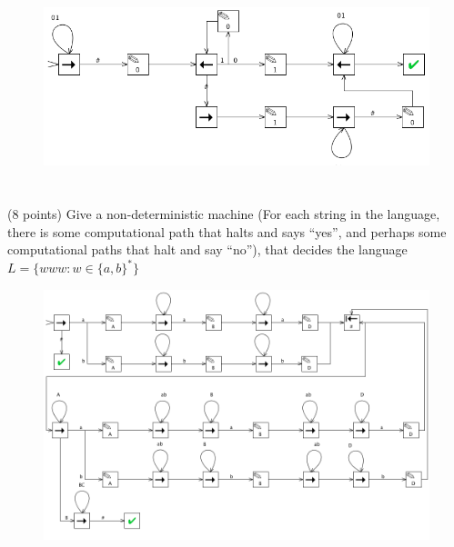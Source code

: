 \documentclass[paper=a4, fontsize=11pt]{scrartcl} %
\begin{document}
\begin{figure}[hp]
  \centering
  \includegraphics[width=\textwidth]{10-2.png}
\end{figure}

\pagebreak

\section{}

\begin{fancyquotes}
  (8 points) Give a non-deterministic machine (For each string in the
  language, there is some computational path that halts and says
  ``yes'', and perhaps some computational paths that halt and say
  ``no''), that decides the language $L=\{www: w\in\{a,b\}^*\}$
\end{fancyquotes}

\begin{figure}[hp]
  \centering
  \includegraphics[width=\textwidth]{10-3.png}
\end{figure}
\end{document}

